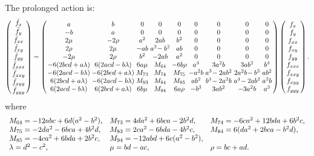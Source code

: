 \documentclass[review,onefignum,onetabnum]{siamonline190516}
\begin{document}
The prolonged action is:
\begin{equation}
\small
\arraycolsep=1.4pt
\left(
\begin{array}{c}
  \bar f_x \\ \bar f_y \\ \bar f_{xx} \\ \bar f_{xy} \\ \bar f_{yy} \\ \bar f_{xxx} \\ \bar f_{xxy} \\ \bar f_{xyy} \\ \bar f_{yyy} 
 \end{array}
 \right)
 = 
\left(
\begin{array}{ccccccccc}
 a & b & 0 & 0 & 0 & 0 & 0 & 0 & 0 \\
 -b & a & 0 & 0 & 0 & 0 & 0 & 0 & 0 \\
 2\mu & -2 \rho & a^2 & 2 a b & b^2 & 0 & 0 & 0 & 0 \\
 2 \rho & 2\mu & -a b & a^2\!-b^2 & a b & 0 & 0 & 0 & 0 \\
 -2\mu & 2 \rho & b^2 & -2 a b & a^2 & 0 & 0 & 0 & 0 \\
 -6 (2 b c d+a \lambda) & 6 (2 a c d-b\lambda) & 6 a \mu &
  M_{64}  & -6 b \rho & a^3 & 3 a^2 b & 3 a b^2 & b^3 \\
 -6 (2 a c d-b\lambda) & -6 (2 b c d+a \lambda) & M_{73}& M_{74} & 
 M_{75} & -a^2 b & a^3\!-2 a b^2 & 2
   a^2 b\!-b^3 & a b^2 \\
 6 (2 b c d+a \lambda) & -6 (2 a c d-b\lambda) & M_{83} & M_{84} & M_{85} & a b^2 & b^3\!-2
   a^2 b & a^3\!-2 a b^2 & a^2 b \\
 6 (2 a c d-b\lambda) & 6 (2 b c d+a \lambda) & 6 b \mu & 
  M_{94} & 6 a \rho & -b^3 & 3 a b^2 & -3 a^2 b & a^3 \\
\end{array}
\right)\left(
\begin{array}{c}
f_x \\ f_y \\ f_{xx} \\ f_{xy} \\ f_{yy} \\ f_{xxx} \\ f_{xxy} \\ f_{xyy} \\ f_{yyy} 
 \end{array}
 \right).
\label{eqn:mobius}
 \end{equation}
 where
 \begin{equation*}
 \small
 \begin{array}{lll}
M_{64}=-12abc+6d(a^2-b^2), & 
M_{73}=4 d a^2+6 b c a-2 b^2 d, & 
M_{74}=-6 c a^2+12 b d a+6 b^2 c, \\
 M_{75}=-2 d a^2-6 b c a+4 b^2 d, &
 M_{83}=2 c a^2-6 b d a-4 b^2 c, &
 M_{84}=6 (d a^2+2 b c a-b^2 d),\\
 M_{85}=-4 c a^2+6 b d a+2 b^2 c,& 
 M_{94}= -12a b d + 6c(a^2-b^2),\\
\lambda=d^2-c^2, & 
\mu = b d - a c, & 
\rho = b c + a d.
\end{array}
\end{equation*}
\end{document}
